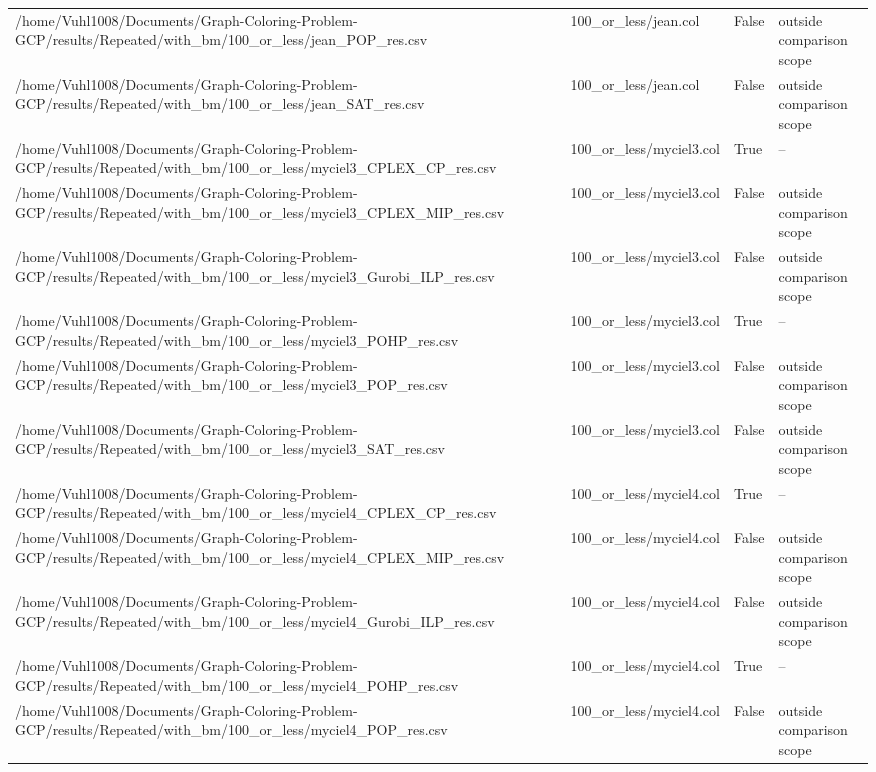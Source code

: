 \begin{table}[htbp]
\begin{tabular}{llll}
/home/Vuhl1008/Documents/Graph-Coloring-Problem-GCP/results/Repeated/with\_bm/100\_or\_less/jean\_POP\_res.csv & 100\_or\_less/jean.col & False & outside comparison scope \\
/home/Vuhl1008/Documents/Graph-Coloring-Problem-GCP/results/Repeated/with\_bm/100\_or\_less/jean\_SAT\_res.csv & 100\_or\_less/jean.col & False & outside comparison scope \\
/home/Vuhl1008/Documents/Graph-Coloring-Problem-GCP/results/Repeated/with\_bm/100\_or\_less/myciel3\_CPLEX\_CP\_res.csv & 100\_or\_less/myciel3.col & True & -- \\
/home/Vuhl1008/Documents/Graph-Coloring-Problem-GCP/results/Repeated/with\_bm/100\_or\_less/myciel3\_CPLEX\_MIP\_res.csv & 100\_or\_less/myciel3.col & False & outside comparison scope \\
/home/Vuhl1008/Documents/Graph-Coloring-Problem-GCP/results/Repeated/with\_bm/100\_or\_less/myciel3\_Gurobi\_ILP\_res.csv & 100\_or\_less/myciel3.col & False & outside comparison scope \\
/home/Vuhl1008/Documents/Graph-Coloring-Problem-GCP/results/Repeated/with\_bm/100\_or\_less/myciel3\_POHP\_res.csv & 100\_or\_less/myciel3.col & True & -- \\
/home/Vuhl1008/Documents/Graph-Coloring-Problem-GCP/results/Repeated/with\_bm/100\_or\_less/myciel3\_POP\_res.csv & 100\_or\_less/myciel3.col & False & outside comparison scope \\
/home/Vuhl1008/Documents/Graph-Coloring-Problem-GCP/results/Repeated/with\_bm/100\_or\_less/myciel3\_SAT\_res.csv & 100\_or\_less/myciel3.col & False & outside comparison scope \\
/home/Vuhl1008/Documents/Graph-Coloring-Problem-GCP/results/Repeated/with\_bm/100\_or\_less/myciel4\_CPLEX\_CP\_res.csv & 100\_or\_less/myciel4.col & True & -- \\
/home/Vuhl1008/Documents/Graph-Coloring-Problem-GCP/results/Repeated/with\_bm/100\_or\_less/myciel4\_CPLEX\_MIP\_res.csv & 100\_or\_less/myciel4.col & False & outside comparison scope \\
/home/Vuhl1008/Documents/Graph-Coloring-Problem-GCP/results/Repeated/with\_bm/100\_or\_less/myciel4\_Gurobi\_ILP\_res.csv & 100\_or\_less/myciel4.col & False & outside comparison scope \\
/home/Vuhl1008/Documents/Graph-Coloring-Problem-GCP/results/Repeated/with\_bm/100\_or\_less/myciel4\_POHP\_res.csv & 100\_or\_less/myciel4.col & True & -- \\
/home/Vuhl1008/Documents/Graph-Coloring-Problem-GCP/results/Repeated/with\_bm/100\_or\_less/myciel4\_POP\_res.csv & 100\_or\_less/myciel4.col & False & outside comparison scope \\

\end{tabular}
\end{table}
